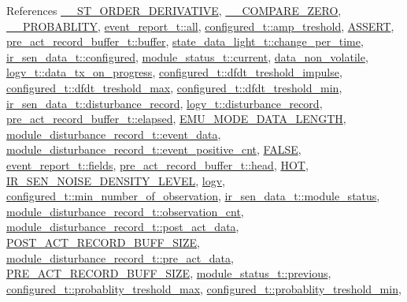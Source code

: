 References \hyperlink{a00021_source_l00030}{\+\_\+\+\_\+S\+T\+\_\+\+O\+R\+D\+E\+R\+\_\+\+D\+E\+R\+I\+V\+A\+T\+I\+V\+E}, \hyperlink{a00021_source_l00027}{\+\_\+\+\_\+\+C\+O\+M\+P\+A\+R\+E\+\_\+\+Z\+E\+R\+O}, \hyperlink{a00021_source_l00033}{\+\_\+\+\_\+\+P\+R\+O\+B\+A\+B\+L\+I\+T\+Y}, \hyperlink{a00021_source_l00235}{event\+\_\+report\+\_\+t\+::all}, \hyperlink{a00021_a4b3bbfb0267daea1432f2603825ade62}{configured\+\_\+t\+::amp\+\_\+treshold}, \hyperlink{a00072_source_l00059}{A\+S\+S\+E\+R\+T}, \hyperlink{a00022_source_l00137}{pre\+\_\+act\+\_\+record\+\_\+buffer\+\_\+t\+::buffer}, \hyperlink{a00017_source_l00148}{state\+\_\+data\+\_\+light\+\_\+t\+::change\+\_\+per\+\_\+time}, \hyperlink{a00023_source_l00040}{ir\+\_\+sen\+\_\+data\+\_\+t\+::configured}, \hyperlink{a00017_source_l00156}{module\+\_\+status\+\_\+t\+::current}, \hyperlink{a00060_source_l00016}{data\+\_\+non\+\_\+volatile}, \hyperlink{a00021_a6cdefde69642ef511e3252c38be68516}{logv\+\_\+t\+::data\+\_\+tx\+\_\+on\+\_\+progress}, \hyperlink{a00021_source_l00189}{configured\+\_\+t\+::dfdt\+\_\+treshold\+\_\+impulse}, \hyperlink{a00021_source_l00190}{configured\+\_\+t\+::dfdt\+\_\+treshold\+\_\+max}, \hyperlink{a00021_source_l00191}{configured\+\_\+t\+::dfdt\+\_\+treshold\+\_\+min}, \hyperlink{a00023_source_l00045}{ir\+\_\+sen\+\_\+data\+\_\+t\+::disturbance\+\_\+record}, \hyperlink{a00021_a11ed024c2cc5c53c79b2c0a8b35e3c06}{logv\+\_\+t\+::disturbance\+\_\+record}, \hyperlink{a00022_source_l00140}{pre\+\_\+act\+\_\+record\+\_\+buffer\+\_\+t\+::elapsed}, \hyperlink{a00022_source_l00015}{E\+M\+U\+\_\+\+M\+O\+D\+E\+\_\+\+D\+A\+T\+A\+\_\+\+L\+E\+N\+G\+T\+H}, \hyperlink{a00022_source_l00228}{module\+\_\+disturbance\+\_\+record\+\_\+t\+::event\+\_\+data}, \hyperlink{a00022_source_l00182}{module\+\_\+disturbance\+\_\+record\+\_\+t\+::event\+\_\+positive\+\_\+cnt}, \hyperlink{a00040_source_l00086}{F\+A\+L\+S\+E}, \hyperlink{a00021_a5296d090c085b0421fdf5a86e382abea}{event\+\_\+report\+\_\+t\+::fields}, \hyperlink{a00022_source_l00142}{pre\+\_\+act\+\_\+record\+\_\+buffer\+\_\+t\+::head}, \hyperlink{a00021_source_l00153}{H\+O\+T}, \hyperlink{a00017_source_l00018}{I\+R\+\_\+\+S\+E\+N\+\_\+\+N\+O\+I\+S\+E\+\_\+\+D\+E\+N\+S\+I\+T\+Y\+\_\+\+L\+E\+V\+E\+L}, \hyperlink{a00038_source_l00036}{logv}, \hyperlink{a00021_source_l00200}{configured\+\_\+t\+::min\+\_\+number\+\_\+of\+\_\+observation}, \hyperlink{a00023_source_l00049}{ir\+\_\+sen\+\_\+data\+\_\+t\+::module\+\_\+status}, \hyperlink{a00022_source_l00180}{module\+\_\+disturbance\+\_\+record\+\_\+t\+::observation\+\_\+cnt}, \hyperlink{a00022_source_l00177}{module\+\_\+disturbance\+\_\+record\+\_\+t\+::post\+\_\+act\+\_\+data}, \hyperlink{a00022_source_l00014}{P\+O\+S\+T\+\_\+\+A\+C\+T\+\_\+\+R\+E\+C\+O\+R\+D\+\_\+\+B\+U\+F\+F\+\_\+\+S\+I\+Z\+E}, \hyperlink{a00022_source_l00176}{module\+\_\+disturbance\+\_\+record\+\_\+t\+::pre\+\_\+act\+\_\+data}, \hyperlink{a00022_source_l00013}{P\+R\+E\+\_\+\+A\+C\+T\+\_\+\+R\+E\+C\+O\+R\+D\+\_\+\+B\+U\+F\+F\+\_\+\+S\+I\+Z\+E}, \hyperlink{a00017_source_l00157}{module\+\_\+status\+\_\+t\+::previous}, \hyperlink{a00021_source_l00202}{configured\+\_\+t\+::probablity\+\_\+treshold\+\_\+max}, \hyperlink{a00021_source_l00201}{configured\+\_\+t\+::probablity\+\_\+treshold\+\_\+min}, 